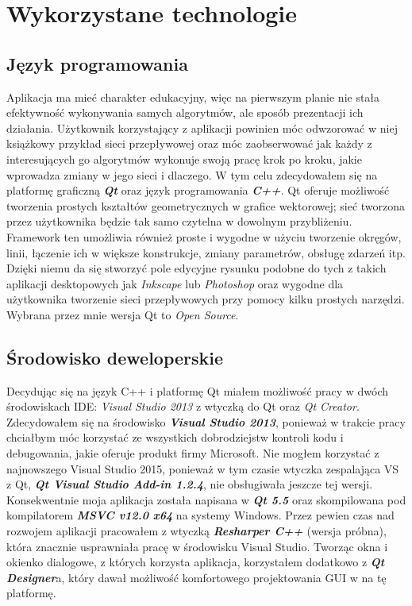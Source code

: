 \section{Wykorzystane technologie}
\subsection{Język programowania}
Aplikacja ma mieć charakter edukacyjny, więc na pierwszym planie nie stała efektywność wykonywania samych algorytmów, ale sposób prezentacji ich działania. Użytkownik korzystający z aplikacji powinien móc odwzorować w niej książkowy przykład sieci przepływowej oraz móc zaobserwować jak każdy z interesujących go algorytmów wykonuje swoją pracę krok po kroku, jakie wprowadza zmiany w jego sieci i dlaczego. W tym celu zdecydowałem się na platformę graficzną \textbf{\textit{Qt}} oraz język programowania \textbf{\textit{C++}}. Qt oferuje możliwość tworzenia prostych kształtów geometrycznych w grafice wektorowej; sieć tworzona przez użytkownika będzie tak samo czytelna w dowolnym przybliżeniu. Framework ten umożliwia również proste i wygodne w użyciu tworzenie okręgów, linii, łączenie ich w większe konstrukcje, zmiany parametrów, obsługę zdarzeń itp. Dzięki niemu da się stworzyć pole edycyjne rysunku podobne do tych z takich aplikacji desktopowych jak \textit{Inkscape} lub \textit{Photoshop} oraz wygodne dla użytkownika tworzenie sieci przepływowych przy pomocy kilku prostych narzędzi. Wybrana przez mnie wersja Qt to \emph{Open Source}.
\subsection{Środowisko deweloperskie}
Decydując się na język C++ i platformę Qt miałem możliwość pracy w dwóch środowiskach IDE: \textit{Visual Studio 2013} z wtyczką do Qt oraz \textit{Qt Creator}. Zdecydowałem się na środowisko \textit{\textbf{Visual Studio 2013}}, ponieważ w trakcie pracy chciałbym móc korzystać ze wszystkich dobrodziejstw kontroli kodu i debugowania, jakie oferuje produkt firmy Microsoft. Nie mogłem korzystać z najnowszego Visual Studio 2015, ponieważ w tym czasie wtyczka zespalająca VS z Qt, \textbf{\textit{Qt Visual Studio Add-in 1.2.4}}, nie obsługiwała jeszcze tej wersji. Konsekwentnie moja aplikacja została napisana w \textit{\textbf{Qt 5.5}} oraz skompilowana pod kompilatorem \textbf{\textit{MSVC v12.0 x64}} na systemy Windows. Przez pewien czas nad rozwojem aplikacji pracowałem z wtyczką \textbf{\textit{Resharper C++}} (wersja próbna), która znacznie usprawniała pracę w środowisku Visual Studio. Tworząc okna i okienko dialogowe, z których korzysta aplikacja, korzystałem dodatkowo z \textbf{\textit{Qt Designer}}a, który dawał możliwość komfortowego projektowania GUI w na tę platformę.
